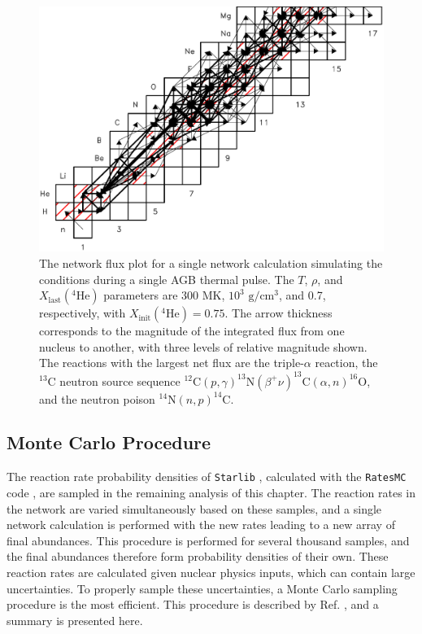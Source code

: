 \begin{figure}[t]
\centering
\includegraphics[width=6.5in]{Chapter-3/figs/Flux.png}
\caption{\label{fig:Flux}The network flux plot for a single network calculation simulating the conditions during a single AGB thermal pulse. The $T$, $\rho$, and $X_{\mathrm{last}}(^{4}\mathrm{He})$ parameters are 300 MK, $10^{3}$ $\mathrm{g}/\mathrm{cm}^{3}$, and 0.7, respectively, with $X_{\mathrm{init}}(^{4}\mathrm{He}) = 0.75$. The arrow thickness corresponds to the magnitude of the integrated flux from one nucleus to another, with three levels of relative magnitude shown. The reactions with the largest net flux are the triple-$\alpha$ reaction, the $^{13}$C neutron source sequence $^{12}\mathrm{C}(p,\gamma)^{13}\mathrm{N}(\beta^{+}\nu)^{13}\mathrm{C}(\alpha,n)^{16}\mathrm{O}$, and the neutron poison $^{14}\mathrm{N}(n,p)^{14}\mathrm{C}$.}
\end{figure}

\subsection{Monte Carlo Procedure}



The reaction rate probability densities of \texttt{Starlib} \cite{Sallaska2013}, calculated with the \texttt{RatesMC} code \cite{Longland2010a}, are sampled in the remaining analysis of this chapter. The reaction rates in the network are varied simultaneously based on these samples, and a single network calculation is performed with the new rates leading to a new array of final abundances. This procedure is performed for several thousand samples, and the final abundances therefore form probability densities of their own. These reaction rates are calculated given nuclear physics inputs, which can contain large uncertainties. To properly sample these uncertainties, a Monte Carlo sampling procedure is the most efficient. This procedure is described by Ref. \cite{Longland2012}, and a summary is presented here. 

